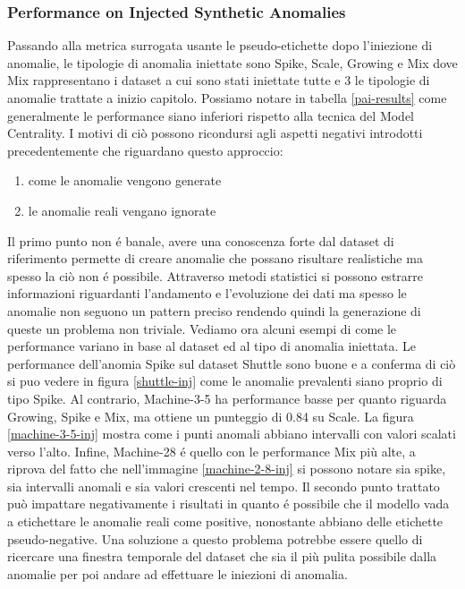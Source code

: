 \newpage
\subsubsection{Performance on Injected Synthetic Anomalies}
Passando alla metrica surrogata usante le pseudo-etichette dopo l'iniezione di anomalie, le tipologie di anomalia iniettate sono Spike, Scale, Growing e Mix dove Mix rappresentano i dataset a cui sono stati iniettate tutte e 3 le tipologie di anomalie trattate a inizio capitolo. Possiamo notare in tabella \ref{pai-results} come generalmente le performance siano inferiori rispetto alla tecnica del Model Centrality. I motivi di ciò possono ricondursi agli aspetti negativi introdotti precedentemente che riguardano questo approccio: 
\begin{enumerate}
	\item come le anomalie vengono generate
	\item le anomalie reali vengano ignorate
\end{enumerate}
Il primo punto non é banale, avere una conoscenza forte dal dataset di riferimento permette di creare anomalie che possano risultare realistiche ma spesso la ciò non é possibile. Attraverso metodi statistici si possono estrarre informazioni riguardanti l'andamento e l'evoluzione dei dati ma spesso le anomalie non seguono un pattern preciso rendendo quindi la generazione di queste un problema non triviale. 
Vediamo ora alcuni esempi di come le performance variano in base al dataset ed al tipo di anomalia iniettata. Le performance dell'anomia Spike sul dataset Shuttle sono buone e a conferma di ciò si puo vedere in figura \ref{shuttle-inj} come le anomalie prevalenti siano proprio di tipo Spike.
Al contrario, Machine-3-5 ha performance basse per quanto riguarda Growing, Spike e Mix, ma ottiene un punteggio di 0.84 su Scale. La figura \ref{machine-3-5-inj} mostra come i punti anomali abbiano intervalli con valori scalati verso l'alto. Infine, Machine-28 é quello con le performance Mix più alte, a riprova del fatto che nell'immagine \ref{machine-2-8-inj} si possono notare sia spike, sia intervalli anomali e sia valori crescenti nel tempo.
Il secondo punto trattato può impattare negativamente i risultati in quanto é possibile che il modello vada a etichettare le anomalie reali come positive, nonostante abbiano delle etichette pseudo-negative. Una soluzione a questo problema potrebbe essere quello di ricercare una finestra temporale del dataset che sia il più pulita possibile dalla anomalie per poi andare ad effettuare le iniezioni di anomalia.

